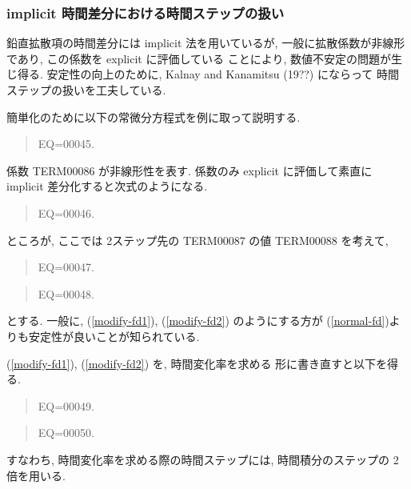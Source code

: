 \subsubsection{implicit 時間差分における時間ステップの扱い}

鉛直拡散項の時間差分には implicit 法を用いているが, 
一般に拡散係数が非線形であり, この係数を explicit に評価している
ことにより, 数値不安定の問題が生じ得る. 
安定性の向上のために, Kalnay and Kanamitsu (19??) にならって
時間ステップの扱いを工夫している. 

簡単化のために以下の常微分方程式を例に取って説明する. 
\begin{quote}
EQ=00045.
\end{quote}
係数 TERM00086 が非線形性を表す. 
係数のみ explicit に評価して素直に implicit 差分化すると次式のようになる. 
\begin{quote}
EQ=00046.
\label{normal-fd}
\end{quote}
ところが, ここでは 2ステップ先の TERM00087 の値 TERM00088 を考えて, 
\begin{quote}
EQ=00047.
\label{modify-fd1}
\end{quote}
\begin{quote}
EQ=00048.
\label{modify-fd2}
\end{quote}
とする. 
一般に, (\ref{modify-fd1}), (\ref{modify-fd2}) のようにする方が
(\ref{normal-fd})よりも安定性が良いことが知られている. 

(\ref{modify-fd1}), (\ref{modify-fd2}) を, 時間変化率を求める
形に書き直すと以下を得る. 
\begin{quote}
EQ=00049.
\end{quote}
\begin{quote}
EQ=00050.
\end{quote}
すなわち, 時間変化率を求める際の時間ステップには, 
時間積分のステップの 2 倍を用いる. 

